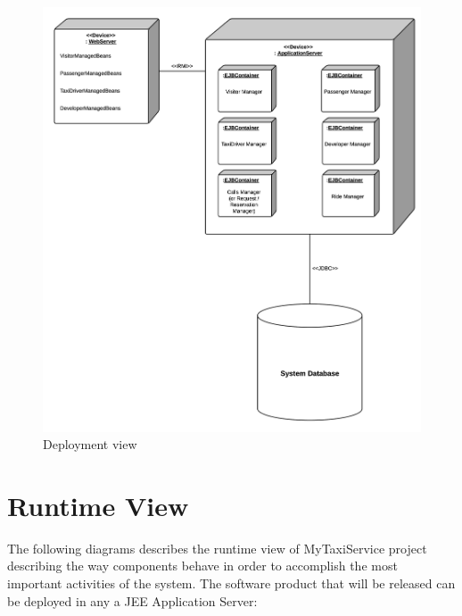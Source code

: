 \begin{figure}[htbp]
\centering
\includegraphics[width=\textwidth]{cpt/img/RuntimeDeploymentView}
\caption{Deployment view}
\label{fig:Deploy}
\end{figure}
\clearpage

\section{Runtime View}
The following diagrams describes the runtime view of MyTaxiService project describing the way components behave in order to accomplish the most important activities of the system. The software product that will be released can be deployed in any a JEE Application Server:

